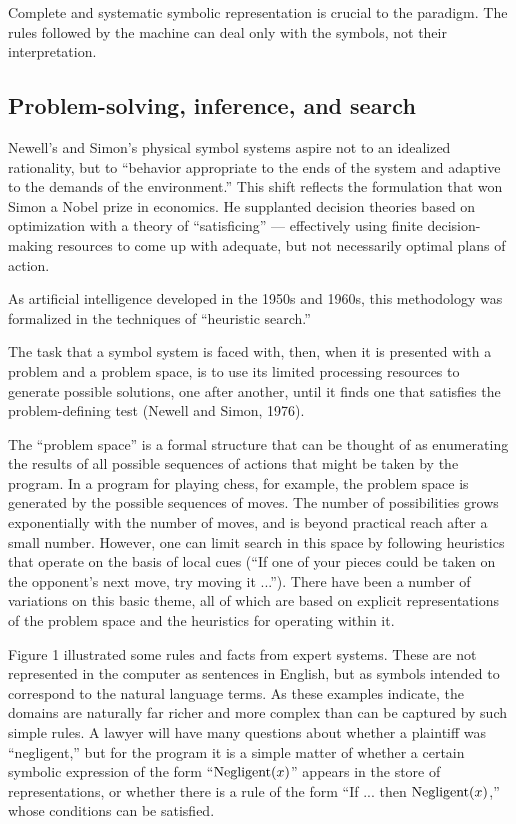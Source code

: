 \documentclass[12pt]{article}
\begin{document}
Complete and systematic symbolic representation is crucial to the
paradigm. The rules followed by the machine can deal only with the
symbols, not their interpretation.

\subsection{Problem-solving, inference, and search}

Newell’s and Simon’s physical symbol systems aspire not to an idealized rationality, but to ``behavior appropriate to the ends of the system and adaptive to the demands of the environment.'' This shift reflects the formulation that won Simon a Nobel prize in economics. He supplanted decision theories based on optimization with a theory of ``satisficing'' --- effectively using finite decision-making resources to come up with adequate, but not necessarily optimal plans of action.

As artificial intelligence developed in the 1950s and 1960s, this methodology was formalized in the techniques of ``heuristic search.''

The task that a symbol system is faced with, then, when it is presented with a problem and a problem space, is to use its limited processing resources to generate possible solutions, one after another, until it finds one that satisfies the problem-defining test (Newell and Simon, 1976).

The ``problem space'' is a formal structure that can be thought of as enumerating the results of all possible sequences of actions that might be taken by the program. In a program for playing chess, for example, the problem space is generated by the possible sequences of moves. The number of possibilities grows exponentially with the number of moves, and is beyond practical reach after a small number. However, one can limit search in this space by following heuristics that operate on the basis of local cues (``If one of your pieces could be taken on the opponent’s next move, try moving it ...''). There have been a number of variations on this basic theme, all of which are based on explicit representations of the problem space and the heuristics for operating within it.

Figure 1 illustrated some rules and facts from expert systems. These are not represented in the computer as sentences in English, but as symbols intended to correspond to the natural language terms. As these examples indicate, the domains are naturally far richer and more complex than can be captured by such simple rules. A lawyer will have many questions about whether a plaintiff was ``negligent,'' but for the program it is a simple matter of whether a certain symbolic expression of the form ``$\mathop {\rm Negligent}(x)$'' appears in the store of representations, or whether there is a rule of the form ``If ... then $\mathop {\rm Negligent}(x)$,'' whose conditions can be satisfied.
\end{document}
